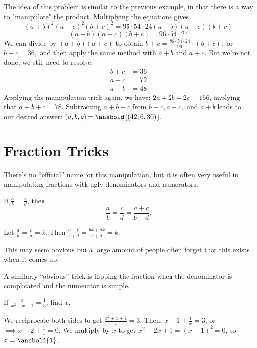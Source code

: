 \documentclass[mast]{lucky}
\begin{document}
\begin{sol}
The idea of this problem is similar to the previous example, in that there is a way to "manipulate" the product. Multiplying the equations gives
\[(a+b)^2(a+c)^2(b+c)^2 = 96 \cdot 54 \cdot 24(a+b)(a+c)(b+c)\]
\[(a+b)(a+c)(b+c)= 96 \cdot 54 \cdot 24\]
We can divide by $(a+b)(a+c)$ to obtain $b+c = \frac{96 \cdot 54 \cdot 24}{96} \cdot (b+c),$ or $b+c = 36,$ and then apply the same method with $a+b$ and $a+c.$ But we're not done, we still need to resolve:
\begin{align*}
b+c &= 36 \\
a+c &= 72\\
a+b &= 48
\end{align*}
Applying the manipulation trick again, we have: $2a +2b+2c = 156$, implying that $a+b+c = 78.$ Subtracting $a+b+c$ from $b+c,a+c,$ and $a+b$ leads to our desired answer: $(a,b,c)=\ansbold{(42,6,30)}.$
\end{sol}

\section{Fraction Tricks}
There's no ``official'' name for this manipulation, but it is often very useful in manipulating fractions with ugly denominators and numerators. 
\begin{theo}
If $\frac{a}{b}=\frac{c}{d}$, then
\[\frac{a}{b}=\frac{c}{d}=\frac{a+c}{b+d}.\]
\end{theo}

\begin{pro}
Let $\frac{a}{b}=\frac{c}{d}=k$. Then $\frac{a+c}{b+d}=\frac{bk+dk}{b+d}=k$.
\end{pro}

This may seem obvious but a large amount of people often forget that this exists when it comes up.

A similarly ``obvious'' trick is flipping the fraction when the denominator is complicated and the numerator is simple.

\begin{exam}[Classic]
If $\frac{x}{x^2+x+1}=\frac{1}{3}$, find $x$.
\end{exam}

\begin{sol}
We reciprocate both sides to get $\frac{x^2+x+1}{x}=3$. Then, $x+1+\frac{1}{x}=3$, or $\implies x-2+\frac{1}{x}=0$. We multiply by $x$ to get $x^2-2x+1=(x-1)^2=0$, so $x=\ansbold{1}$.
\end{sol}
\end{document}
